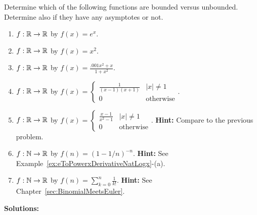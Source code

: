 \begin{example}Determine which of the following functions are bounded versus unbounded. Determine also if they have any asymptotes or not.

    \begin{enumerate}
\renewcommand{\labelenumi}{(\alph{enumi})}
\setlength{\itemsep}{.2cm}
    \item  $f:\mathbb R \to \mathbb R$ by $f(x) = e^{x}$.
    \item  $f:\mathbb R \to \mathbb R$ by $f(x) = x^2$.
    \item $f:\mathbb R \to \mathbb R$ by $f(x) = \frac{.001 x^2 + x}{1 + x^2}$.
    \item $f:\mathbb R \to \mathbb R$ by $f(x) = \begin{cases} \frac{1}{(x-1)(x+1)} & |x| \neq 1\\ 0 & \text{otherwise} \end{cases}$.
    \item $f:\mathbb R \to \mathbb R$ by $f(x) = \begin{cases} \frac{x-1}{x^2 - 1} & |x| \neq 1\\ 0 & \text{otherwise} \end{cases}$. \textbf{Hint:} Compare to the previous problem.
    \item $f: \mathbb N \to \mathbb R$ by $f(n)=(1 - 1/n)^{-n}$. \textbf{Hint:} See Example~\ref{ex:eToPowerxDerivativeNatLogx}-(a).
    \item $f: \mathbb N \to \mathbb R$ by $f(n)= \sum_{k=0}^n\frac{1}{k !}$. \textbf{Hint:} See Chapter~\ref{sec:BinomialMeetsEuler}.
    \end{enumerate}
\end{example}

\textbf{Solutions:}

